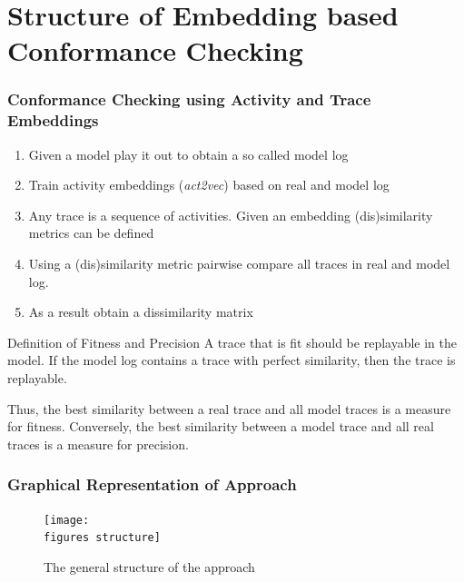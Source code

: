 \documentclass{beamer}
\newcommand{\figures}{../figures/}
\begin{document}
	\section{Structure of Embedding based Conformance Checking}
\begin{frame}
	\frametitle{Conformance Checking using Activity and Trace Embeddings}
	\begin{enumerate}
		\item Given a model play it out to obtain a so called model log
		\item Train activity embeddings (\emph{act2vec}) based on real and model log
		\item Any trace is a sequence of activities. Given an embedding (dis)similarity metrics can be defined
		\item Using a (dis)similarity metric pairwise compare all traces in real and model log.
		\item As a result obtain a dissimilarity matrix
	\end{enumerate}
\begin{block}{Definition of Fitness and Precision}
	A trace that is fit should be replayable in the model. If the model log contains a trace with perfect similarity, then the trace is replayable.
	
	Thus, the best similarity between a real trace and all model traces is a measure for fitness. Conversely, the best similarity between a model trace and all real traces is a measure for precision.
\end{block}
\end{frame}
	
	
	\begin{frame}
		\frametitle{Graphical Representation of Approach}
		\begin{figure}
			\texttt{[image: \\figures structure]}
			\caption{The general structure of the approach}
			\label{fig:structure}
		\end{figure}
	\end{frame}
	
\end{document}
